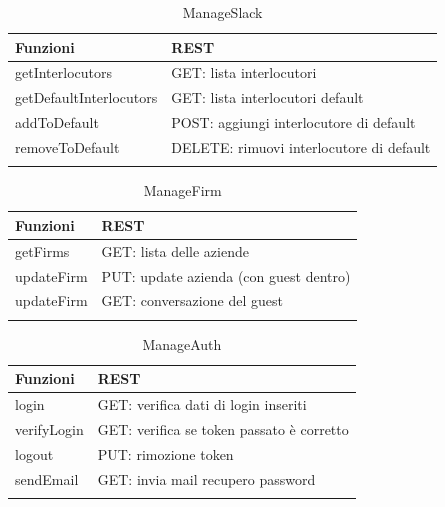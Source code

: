 \documentclass[../DefinizioneDiProdotto.tex]{subfiles}
\begin{document}
		\begin{longtable}[c] { >{\centering\arraybackslash}p{4cm} >{\centering\arraybackslash}p{6cm}}
				\toprule
				\centerline{\textbf{Funzioni}} & \centerline{\textbf{REST}} \\
				\midrule
				getInterlocutors &  GET: lista interlocutori \\
		 		\addlinespace[0.3em]
				\midrule
				\addlinespace[0.3em]
				getDefaultInterlocutors & GET: lista interlocutori default \\
		 		\addlinespace[0.3em]
				\midrule
				\addlinespace[0.3em]
				addToDefault & POST: aggiungi interlocutore di default \\
		 		\addlinespace[0.3em]
				\midrule
				\addlinespace[0.3em]
				removeToDefault & DELETE: rimuovi interlocutore di default \\

				\bottomrule
				\caption{ManageSlack}
		\end{longtable}

		\newpage
		\begin{longtable}[c] { >{\centering\arraybackslash}p{3cm} >{\centering\arraybackslash}p{6cm}}
				\toprule
				\centerline{\textbf{Funzioni}} & \centerline{\textbf{REST}} \\
				\midrule
				getFirms &  GET: lista delle aziende \\
		 		\addlinespace[0.3em]
				\midrule
				\addlinespace[0.3em]
				updateFirm & PUT: update azienda (con guest dentro) \\
		 		\addlinespace[0.3em]
				\midrule
				\addlinespace[0.3em]
				updateFirm & GET: conversazione del guest \\

				\bottomrule
				\caption{ManageFirm}
		\end{longtable}

		\begin{longtable}[c] { >{\centering\arraybackslash}p{3cm} >{\centering\arraybackslash}p{6cm}}
				\toprule
				\centerline{\textbf{Funzioni}} & \centerline{\textbf{REST}} \\
				\midrule
				login &  GET: verifica dati di login inseriti \\
		 		\addlinespace[0.3em]
				\midrule
				\addlinespace[0.3em]
				verifyLogin & GET: verifica se token passato è corretto \\
		 		\addlinespace[0.3em]
				\midrule
				\addlinespace[0.3em]
				logout & PUT: rimozione token \\
		 		\addlinespace[0.3em]
				\midrule
				\addlinespace[0.3em]
				sendEmail & GET: invia mail recupero password \\

				\bottomrule
				\caption{ManageAuth}
		\end{longtable}
\end{document}

